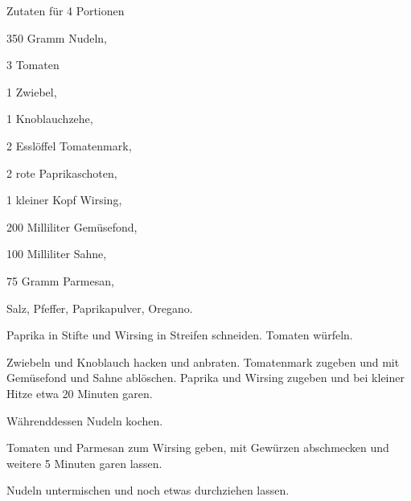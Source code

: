 \startsection[title={Wirsing-Paprika Nudeln},reference=wirsing-paprika-nudeln]

\startitemize
\item Zutaten für 4 Portionen
      \startitemize
      \item 350 Gramm Nudeln,
      \item 3 Tomaten
      \item 1 Zwiebel,
      \item 1 Knoblauchzehe,
      \item 2 Esslöffel Tomatenmark,
      \item 2 rote Paprikaschoten,
      \item 1 kleiner Kopf Wirsing,
      \item 200 Milliliter Gemüsefond,
      \item 100 Milliliter Sahne,
      \item 75 Gramm Parmesan,
      \item Salz, Pfeffer, Paprikapulver, Oregano.
      \stopitemize

\item Paprika in Stifte und Wirsing in Streifen schneiden. Tomaten
      würfeln.
\item Zwiebeln und Knoblauch hacken und anbraten. Tomatenmark zugeben und
  mit Gemüsefond und Sahne ablöschen. Paprika und Wirsing zugeben und
  bei kleiner Hitze etwa 20 Minuten garen.
\item Währenddessen Nudeln kochen.
\item Tomaten und Parmesan zum Wirsing geben, mit Gewürzen abschmecken
  und weitere 5 Minuten garen lassen.
\item Nudeln untermischen und noch etwas durchziehen lassen.
\stopitemize

\stopsection
